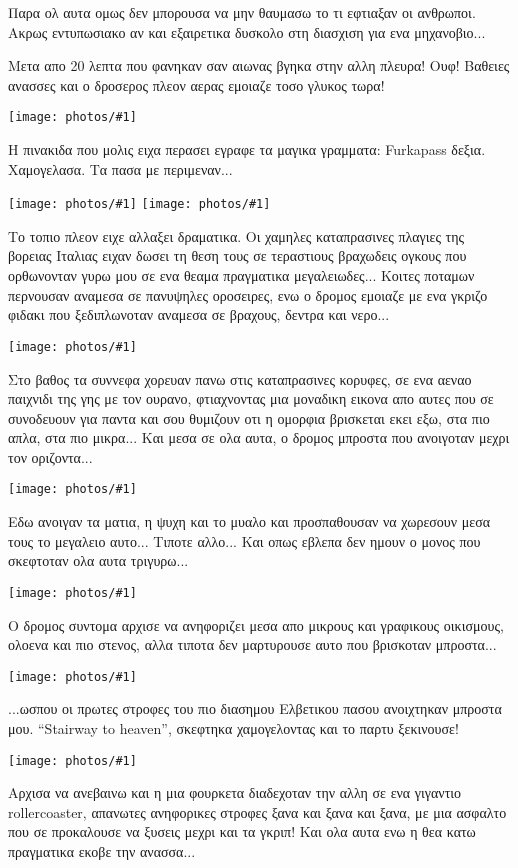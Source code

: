 \documentclass[]{book}
\newcommand\photo[1]{\noindent\texttt{[image: photos/\#1]}}
\begin{document}
Παρα ολ αυτα ομως δεν μπορουσα να μην θαυμασω το τι εφτιαξαν οι ανθρωποι. Ακρως εντυπωσιακο αν και εξαιρετικα δυσκολο στη διασχιση για ενα μηχανοβιο...

Μετα απο 20 λεπτα που φανηκαν σαν αιωνας βγηκα στην αλλη πλευρα! Ουφ! Βαθειες ανασσες και ο δροσερος πλεον αερας εμοιαζε τοσο γλυκος τωρα!

\photo{39.jpg}

Η πινακιδα που μολις ειχα περασει εγραφε τα μαγικα γραμματα: Furkapass δεξια. 
Χαμογελασα. Τα πασα με περιμεναν...

\photo{40.jpg}
\photo{41.jpg}

Το τοπιο πλεον ειχε αλλαξει δραματικα. Οι χαμηλες καταπρασινες πλαγιες της βορειας Ιταλιας ειχαν δωσει τη θεση τους σε τεραστιους βραχωδεις ογκους που ορθωνονταν γυρω μου σε ενα θεαμα πραγματικα μεγαλειωδες...
Κοιτες ποταμων περνουσαν αναμεσα σε πανυψηλες οροσειρες, ενω ο δρομος εμοιαζε με ενα γκριζο φιδακι που ξεδιπλωνοταν αναμεσα σε βραχους, δεντρα και νερο...

\photo{42.jpg}

Στο βαθος τα συννεφα χορευαν πανω στις καταπρασινες κορυφες, σε ενα αεναο παιχνιδι της γης με τον ουρανο, φτιαχνοντας μια μοναδικη εικονα απο αυτες που σε συνοδευουν για παντα και σου θυμιζουν οτι η ομορφια βρισκεται εκει εξω, στα πιο απλα, στα πιο μικρα... 
Και μεσα σε ολα αυτα, ο δρομος μπροστα που ανοιγοταν μεχρι τον οριζοντα... 

\photo{43.jpg}

Εδω ανοιγαν τα ματια, η ψυχη και το μυαλο και προσπαθουσαν να χωρεσουν μεσα τους το μεγαλειο αυτο... Τιποτε αλλο...
Και οπως εβλεπα δεν ημουν ο μονος που σκεφτοταν ολα αυτα τριγυρω... 

\photo{44.jpg}

O δρομος συντομα αρχισε να ανηφοριζει μεσα απο μικρους και γραφικους οικισμους, ολοενα και πιο στενος, αλλα τιποτα δεν μαρτυρουσε αυτο που βρισκοταν μπροστα...

\photo{45.jpg}

...ωσπου οι πρωτες στροφες του πιο διασημου Ελβετικου πασου ανοιχτηκαν μπροστα μου. 
``Stairway to heaven'', σκεφτηκα χαμογελοντας και το παρτυ ξεκινουσε!

\photo{46.jpg}

Αρχισα να ανεβαινω και η μια φουρκετα διαδεχοταν την αλλη σε ενα γιγαντιο rollercoaster, απανωτες ανηφορικες στροφες ξανα και ξανα και ξανα, με μια ασφαλτο που σε προκαλουσε να ξυσεις μεχρι και τα γκριπ! 
Και ολα αυτα ενω η θεα κατω πραγματικα εκοβε την ανασσα...
\end{document}
